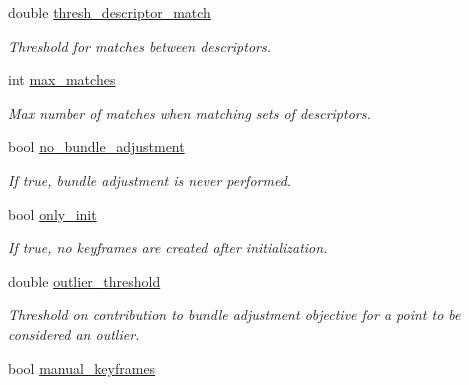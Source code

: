 \begin{DoxyCompactItemize}
\mbox{\label{classMap_a8c2c3f9134ec1c77288b6147c4249897}} 
double \hyperlink{classMap_a8c2c3f9134ec1c77288b6147c4249897}{thresh\+\_\+descriptor\+\_\+match}
\begin{DoxyCompactList}\small\item\em Threshold for matches between descriptors. \end{DoxyCompactList}\item 
\mbox{\label{classMap_a575ed053aec5a34555ee9642b95765eb}} 
int \hyperlink{classMap_a575ed053aec5a34555ee9642b95765eb}{max\+\_\+matches}
\begin{DoxyCompactList}\small\item\em Max number of matches when matching sets of descriptors. \end{DoxyCompactList}\item 
\mbox{\label{classMap_a8a3acc93b77883137eba917691492674}} 
bool \hyperlink{classMap_a8a3acc93b77883137eba917691492674}{no\+\_\+bundle\+\_\+adjustment}
\begin{DoxyCompactList}\small\item\em If true, bundle adjustment is never performed. \end{DoxyCompactList}\item 
\mbox{\label{classMap_abef231667d94cca21fe6afd15f6b7cc0}} 
bool \hyperlink{classMap_abef231667d94cca21fe6afd15f6b7cc0}{only\+\_\+init}
\begin{DoxyCompactList}\small\item\em If true, no keyframes are created after initialization. \end{DoxyCompactList}\item 
\mbox{\label{classMap_ac931ea7b0cb5591952779c5e5ab6192e}} 
double \hyperlink{classMap_ac931ea7b0cb5591952779c5e5ab6192e}{outlier\+\_\+threshold}
\begin{DoxyCompactList}\small\item\em Threshold on contribution to bundle adjustment objective for a point to be considered an outlier. \end{DoxyCompactList}\item 
\mbox{\label{classMap_aa7020f7c1d53310e0d8c6b616038fc0e}} 
bool \hyperlink{classMap_aa7020f7c1d53310e0d8c6b616038fc0e}{manual\+\_\+keyframes}

\end{DoxyCompactItemize}
